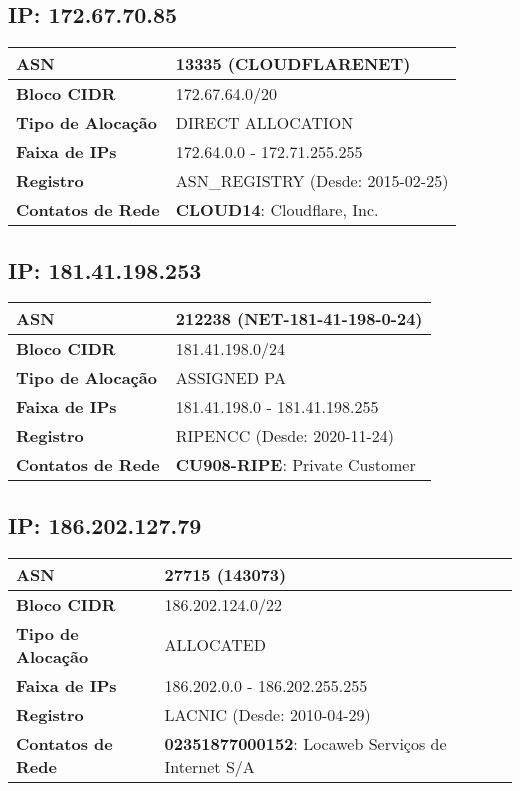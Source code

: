     \subsection{IP: 172.67.70.85}
    \begin{tabular}{|l|l|}
    \hline
    \textbf{ASN} & 13335 (CLOUDFLARENET) \\ \hline
    \textbf{Bloco CIDR} & 172.67.64.0/20 \\ \hline
    \textbf{Tipo de Alocação} & DIRECT ALLOCATION \\ \hline
    \textbf{Faixa de IPs} & 172.64.0.0 - 172.71.255.255 \\ \hline
    \textbf{Registro} & ASN_REGISTRY (Desde: 2015-02-25) \\ \hline
        
\textbf{Contatos de Rede} & \textbf{CLOUD14}: Cloudflare, Inc. 
\\ \hline
\end{tabular}


    \subsection{IP: 181.41.198.253}
    \begin{tabular}{|l|l|}
    \hline
    \textbf{ASN} & 212238 (NET-181-41-198-0-24) \\ \hline
    \textbf{Bloco CIDR} & 181.41.198.0/24 \\ \hline
    \textbf{Tipo de Alocação} & ASSIGNED PA \\ \hline
    \textbf{Faixa de IPs} & 181.41.198.0 - 181.41.198.255 \\ \hline
    \textbf{Registro} & RIPENCC (Desde: 2020-11-24) \\ \hline
        
\textbf{Contatos de Rede} & \textbf{CU908-RIPE}: Private Customer 
\\ \hline
\end{tabular}


    \subsection{IP: 186.202.127.79}
    \begin{tabular}{|l|l|}
    \hline
    \textbf{ASN} & 27715 (143073) \\ \hline
    \textbf{Bloco CIDR} & 186.202.124.0/22 \\ \hline
    \textbf{Tipo de Alocação} & ALLOCATED \\ \hline
    \textbf{Faixa de IPs} & 186.202.0.0 - 186.202.255.255 \\ \hline
    \textbf{Registro} & LACNIC (Desde: 2010-04-29) \\ \hline
        
\textbf{Contatos de Rede} & \textbf{02351877000152}: Locaweb Serviços de Internet S/A 
\\ \hline
\end{tabular}


